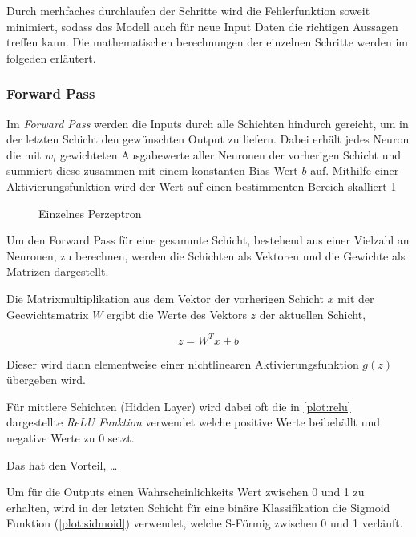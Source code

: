 Durch merhfaches durchlaufen der Schritte wird die Fehlerfunktion soweit minimiert, 
sodass das Modell auch für neue Input Daten die richtigen Aussagen treffen kann.
Die mathematischen berechnungen der einzelnen Schritte werden im folgeden erläutert.


\subsubsection{Forward Pass}
Im \textit{Forward Pass} werden die Inputs durch alle Schichten hindurch 
gereicht, um in der letzten Schicht den gewünschten Output zu liefern.
Dabei erhält jedes Neuron die mit $w_{i}$ gewichteten Ausgabewerte aller
Neuronen der vorherigen Schicht und summiert diese zusammen mit einem konstanten 
Bias Wert $b$ auf. 
Mithilfe einer Aktivierungsfunktion wird der Wert auf einen bestimmenten Bereich 
skalliert \ref{fig:neuron}


\begin{figure}[h]
    \centering
    \label{fig:neuron}
    
    \caption{Einzelnes Perzeptron}
\end{figure}


Um den Forward Pass für eine gesammte Schicht, bestehend aus 
einer Vielzahl an Neuronen, zu berechnen, werden die Schichten 
als Vektoren und die Gewichte als Matrizen dargestellt.

Die Matrixmultiplikation aus dem Vektor der vorherigen 
Schicht $x$ mit der Gecwichtsmatrix $W$ ergibt die Werte
des Vektors $z$ der aktuellen Schicht,

\begin{equation}
    \label{eq:forward}
    z = W^{T}x+b
\end{equation}

Dieser wird dann elementweise einer nichtlinearen Aktivierungsfunktion
$g(z)$ übergeben wird.

Für mittlere Schichten (Hidden Layer) wird dabei oft die in \ref{plot:relu} dargestellte
\textit{ReLU Funktion} verwendet welche positive Werte beibehällt und negative 
Werte zu 0 setzt.

Das hat den Vorteil, \dots

Um für die Outputs einen Wahrscheinlichkeits Wert zwischen 0 und 1 
zu erhalten, wird in der letzten Schicht für eine binäre Klassifikation 
die Sigmoid Funktion (\ref{plot:sidmoid}) verwendet,
welche S-Förmig zwischen 0 und 1 verläuft.

\vspace{1cm}

